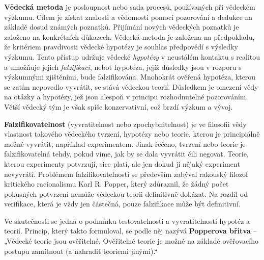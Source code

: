     \begin{tcnote}
      \textbf{Vědecká metoda} je posloupnost nebo sada procesů, používaných při vědeckém výzkumu.
      Cílem je získat znalosti a vědomosti pomocí pozorování a dedukce na základě dosud známých
      poznatků. Přijímání nových vědeckých poznatků je založeno na konkrétních důkazech. Vědecká
      metoda je založena na předpokladu, že kritériem pravdivosti vědecké hypotézy je souhlas
      předpovědí s výsledky výzkumu. Tento přístup udržuje vědecké \emph{hypotézy} v neustálém
      kontaktu s realitou a umožňuje jejich \emph{falzifikaci}, neboť hypotéza, jejíž důsledky jsou
      v rozporu s výzkumnými zjištěními, bude falzifikována. Mnohokrát ověřená hypotéza, kterou se
      zatím nepovedlo vyvrátit, se stává vědeckou teorií. Důsledkem je omezení vědy na otázky a
      hypotézy, jež jsou alespoň v principu rozhodnutelné pozorováním. Větší vědecký tým je však
      spíše konzervativní, což brzdí výzkum a vývoj.

      {\centering
      \captionsetup{type=figure}
      \label{fyz:fig924}
      \par}

      \textbf{Falzifikovatelnost} (vyvratitelnost nebo zpochybnitelnost) je ve filosofii vědy
      vlastnost takového vědeckého tvrzení, hypotézy nebo teorie, kterou je principiálně možné
      vyvrátit, například experimentem. Jinak řečeno, tvrzení nebo teorie je falzifikovatelná tehdy,
      pokud víme, jak by se dala vyvrátit čili negovat. Teorie, kterou experimenty potvrzují, sice
      platí, ale jen dokud ji nějaký experiment nevyvrátí. Problémem falzifikovatelnosti se
      především zabýval rakouský filozof kritického racionalismu Karl R. Popper, který zdůraznil, že
      žádný počet pokusných potvrzení nemůže vědeckou teorii definitivně dokázat. Na rozdíl od
      verifikace, která je vždy jen částečná, pouze falzifikace může být definitivní.

      Ve skutečnosti se jedná o podmínku testovatelnosti a vyvratitelnosti hypotéz a teorií.
      Princip, který takto formuloval, se podle něj nazývá \textbf{Popperova břitva} – „Vědecké
      teorie jsou ověřitelné. Ověřitelné teorie je možné na základě ověřovacího postupu zamítnout (a
      nahradit teoriemi jinými).“


\end{tcnote}
